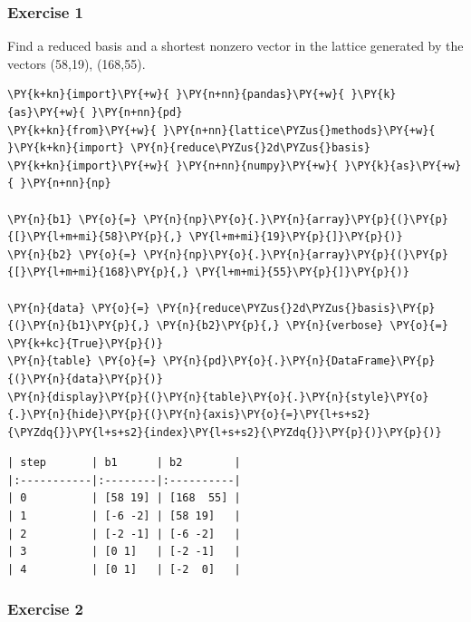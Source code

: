 \documentclass[a4paper,12pt]{article}
\begin{document}
\subsubsection{Exercise 1}\label{exercise-1}

Find a reduced basis and a shortest nonzero vector in the lattice
generated by the vectors (58,19), (168,55).

    \begin{tcolorbox}[breakable, size=fbox, boxrule=1pt, pad at break*=1mm,colback=cellbackground, colframe=cellborder]
\begin{Verbatim}[commandchars=\\\{\}]
\PY{k+kn}{import}\PY{+w}{ }\PY{n+nn}{pandas}\PY{+w}{ }\PY{k}{as}\PY{+w}{ }\PY{n+nn}{pd}
\PY{k+kn}{from}\PY{+w}{ }\PY{n+nn}{lattice\PYZus{}methods}\PY{+w}{ }\PY{k+kn}{import} \PY{n}{reduce\PYZus{}2d\PYZus{}basis}
\PY{k+kn}{import}\PY{+w}{ }\PY{n+nn}{numpy}\PY{+w}{ }\PY{k}{as}\PY{+w}{ }\PY{n+nn}{np}

\PY{n}{b1} \PY{o}{=} \PY{n}{np}\PY{o}{.}\PY{n}{array}\PY{p}{(}\PY{p}{[}\PY{l+m+mi}{58}\PY{p}{,} \PY{l+m+mi}{19}\PY{p}{]}\PY{p}{)}
\PY{n}{b2} \PY{o}{=} \PY{n}{np}\PY{o}{.}\PY{n}{array}\PY{p}{(}\PY{p}{[}\PY{l+m+mi}{168}\PY{p}{,} \PY{l+m+mi}{55}\PY{p}{]}\PY{p}{)}

\PY{n}{data} \PY{o}{=} \PY{n}{reduce\PYZus{}2d\PYZus{}basis}\PY{p}{(}\PY{n}{b1}\PY{p}{,} \PY{n}{b2}\PY{p}{,} \PY{n}{verbose} \PY{o}{=} \PY{k+kc}{True}\PY{p}{)}
\PY{n}{table} \PY{o}{=} \PY{n}{pd}\PY{o}{.}\PY{n}{DataFrame}\PY{p}{(}\PY{n}{data}\PY{p}{)}
\PY{n}{display}\PY{p}{(}\PY{n}{table}\PY{o}{.}\PY{n}{style}\PY{o}{.}\PY{n}{hide}\PY{p}{(}\PY{n}{axis}\PY{o}{=}\PY{l+s+s2}{\PYZdq{}}\PY{l+s+s2}{index}\PY{l+s+s2}{\PYZdq{}}\PY{p}{)}\PY{p}{)}
\end{Verbatim}
\end{tcolorbox}

    
     \begin{Verbatim}[commandchars=\\\{\}]
| step       | b1      | b2        |
|:-----------|:--------|:----------|
| 0          | [58 19] | [168  55] |
| 1          | [-6 -2] | [58 19]   |
| 2          | [-2 -1] | [-6 -2]   |
| 3          | [0 1]   | [-2 -1]   |
| 4          | [0 1]   | [-2  0]   |
    \end{Verbatim}

    
    \subsubsection{Exercise 2}\label{exercise-2}
\end{document}

